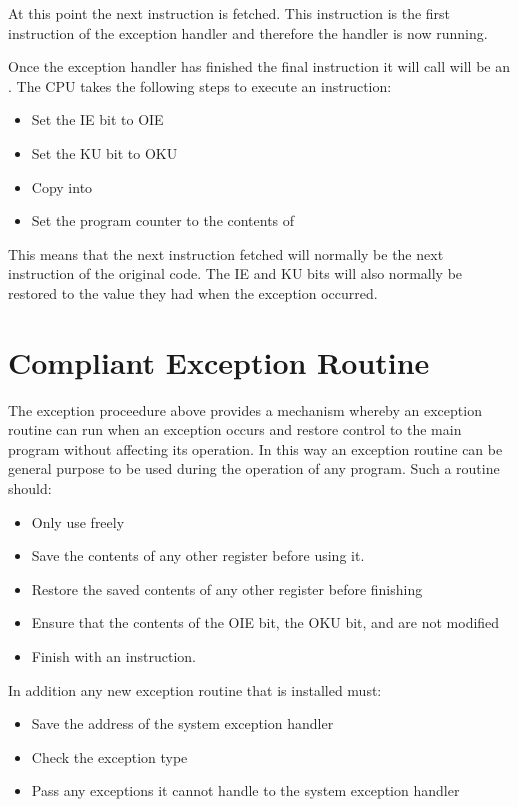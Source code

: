 At this point the next instruction is fetched. This instruction is the
first instruction of the exception handler and therefore the handler
is now running.

Once the exception handler has finished the final instruction it will
call will be an . The CPU takes the following steps to
execute an  instruction:

\begin{itemize}
\item Set the IE bit to OIE
\item Set the KU bit to OKU
\item Copy  into 
\item Set the program counter to the contents of 
\end{itemize}

This means that the next instruction fetched will normally be the
next instruction of the original code. The IE and KU bits will also
normally be restored to the value they had when the exception occurred.

\section{Compliant Exception Routine}

The exception proceedure above provides a mechanism whereby an exception routine
can run when an exception occurs and restore control to the main program without
affecting its operation.  In this way an exception routine can be general
purpose to be used during the operation of any program.  Such a routine should:

\begin{itemize}
\item Only use freely
\item Save the contents of any other register before using it.
\item Restore the saved contents of any other register before finishing
\item Ensure that the contents of the OIE bit, the OKU bit,  and
 are not modified
\item Finish with an   instruction.
\end{itemize}

In addition any new exception routine that is installed must:

\begin{itemize}
\item Save the address of the system exception handler
\item Check the exception type
\item Pass any exceptions it cannot handle to the system exception handler
\end{itemize}

